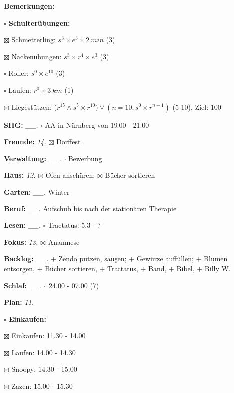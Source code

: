 \documentclass[10pt,a4paper]{article}
\newcommand\prop[1] {{\color {alizarin} {\bf #1}}}             %
\newcommand\mand[1] {{\color {burntorange} {\bf #1}}}          %
\newcommand\topspace{\vskip -15pt \hskip 20pt}
\newcommand\bottomspace{\vskip 4pt}
\newcommand\n[1] { {\sl #1.} \hskip 5pt }
\begin{document}
\begin{mdframed}[style=daystyle]
\begin{labeling}{{\mand {Bemerkungen:}}}
\begin{minipage}{0.75\textwidth}
\begin{labeling}{\prop {$\square$ {Schulterübungen:}}}
      \item[$\boxtimes$ Schmetterling:]   $s^3 \times e^3 \times 2\ min$ (3)
      \item[$\boxtimes$ Nackenübungen:]   $s^3 \times r^4 \times e^3$ (3)
      \item[$\square$ Roller:]          $s^0 \times e^{10}$ (3)
      \item[$\square$ Laufen:]          $r^0 \times 3\ km$ (1)
      \item[$\boxtimes$ Liegestützen:]    ($r^{15} \land s^5 \times r^{10}) \vee (n=10, s^0 \times r^{n-1})$ (5-10), Ziel: 100
      \end{labeling}
    \end{minipage}
    \bottomspace        
  \item[{\mand {SHG:}}]          \n{\_\_} $\square$ AA in Nürnberg von 19.00 - 21.00
  \item[{\mand {Freunde:}}]        \n{14} $\boxtimes$ Dorffest
  \item[{\mand {Verwaltung:}}]   \n{\_\_} $\square$ Bewerbung
  \item[{\mand {Haus:}}]           \n{12} $\boxtimes$ Ofen anschüren; $\boxtimes$ Bücher sortieren
  \item[{\mand {Garten:}}]       \n{\_\_} Winter
  \item[{\mand {Beruf:}}]        \n{\_\_} Aufschub bis nach der stationären Therapie
  \item[{\mand {Lesen:}}]        \n{\_\_} $\square$ Tractatus: 5.3 - ?
  \item[{\mand {Fokus:}}]          \n{13} $\boxtimes$ Anamnese
  \item[{\mand {Backlog:}}]      \n{\_\_} 
      $+$ Zendo putzen, saugen; $+$ Gewürze auffüllen; $+$ Blumen entsorgen, $+$ Bücher sortieren,
      $+$ Tractatus, $+$ Band, $+$ Bibel, $+$ Billy W.
  \item[{\mand {Schlaf:}}]       \n{\_\_} $\square$ 24.00 - 07.00 (7)
  \item[{\mand {Plan:}}]           \n{11}
    \topspace
    \begin{minipage}{0.75\textwidth}  
      \begin{labeling}{\prop {$\square$ {Einkaufen:}}} 
        \setlength\itemsep{-3pt}
      \item[$\boxtimes$ Einkaufen:]  11.30 - 14.00
      \item[$\boxtimes$ Laufen:]     14.00 - 14.30
      \item[$\boxtimes$ Snoopy:]     14.30 - 15.00
      \item[$\boxtimes$ Zazen:]      15.00 - 15.30

\end{labeling}
\end{minipage}
\end{labeling}
\end{mdframed}
\end{document}
